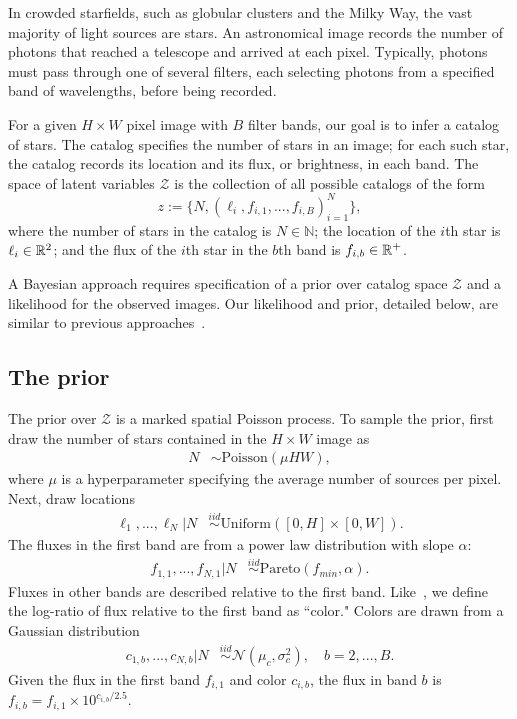 In crowded starfields, such as globular clusters and the Milky Way, the vast majority of light sources are stars.
An astronomical image records the number of photons that reached a telescope and arrived at each pixel.
Typically, photons must pass through one of several filters, each selecting photons from a specified band of wavelengths, before being recorded.

For a given $H \times W$ pixel image with $B$ filter bands, our goal is to infer a catalog of
stars.
The catalog specifies the number of stars
in an image; for each such star, the catalog
records its location and its flux, or brightness,
in each band.
The space of latent variables
$\mathcal{Z}$ is the collection of all possible catalogs of the form
\[z := \{N, (\ell_i, f_{i,1}, ..., f_{i,B})_{i = 1}^N\},\]
where the number of stars in the catalog
is $N\in\mathbb{N}$;
the location of the $i$th star is $\ell_i \in \mathbb{R}^2$; and
the flux of the $i$th star in the $b$th band is $f_{i, b}\in\mathbb{R}^+$.

A Bayesian approach requires specification of a prior over catalog space $\mathcal{Z}$ and a likelihood for the observed images. Our likelihood and prior, detailed below, are similar to previous approaches~\citep{Brewer_2013, Portillo_2017, Feder_2019}.

\subsection{The prior}
The prior over $\mathcal{Z}$ is a marked spatial Poisson process. To sample the prior, first draw the number of stars contained in the $H\times W$ image as
\begin{align}
	N &\sim \text{Poisson}(\mu HW),
	\label{eq:n_prior}
\end{align}
where $\mu$ is a hyperparameter specifying the average number of sources per pixel.
Next, draw locations
\begin{align}
  \ell_1, ..., \ell_N | N &\stackrel{iid}{\sim} \text{Uniform}([0, H] \times [0, W]).
 \end{align}
The fluxes in the first band are from a power law distribution with slope $\alpha$:
\begin{align}
    f_{1, 1}, ..., f_{N,1} | N &
    \stackrel{iid}{\sim} \text{Pareto}(f_{min}, \alpha)
    \label{eq:flux_prior}.
\end{align}
Fluxes in other bands are described relative to the first band. Like~\cite{Feder_2019}, we define the log-ratio of flux relative to the first band as ``color." Colors are drawn from a Gaussian distribution
\begin{align}
  c_{1, b}, ..., c_{N,b} | N  &
      \stackrel{iid}{\sim} \mathcal{N}(\mu_c, \sigma^2_c), \quad b = 2, ..., B.
\end{align}
Given the flux in the first band $f_{i,1}$ and color $c_{i,b}$,
the flux in band $b$ is  $f_{i,b} = f_{i,1} \times 10^{c_{i,b} / 2.5}$.

